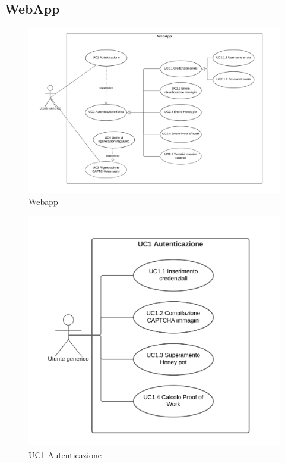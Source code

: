 \subsection{WebApp}

\begin{figure}[H]
    \centering
    \includegraphics[scale=0.6]{img/web_app.png}
    \caption{Webapp}
\end{figure}

\begin{figure}[H]
    \centering
    \includegraphics[scale=0.8]{img/Autenticazione.png}
    \caption{UC1 Autenticazione}
\end{figure}

